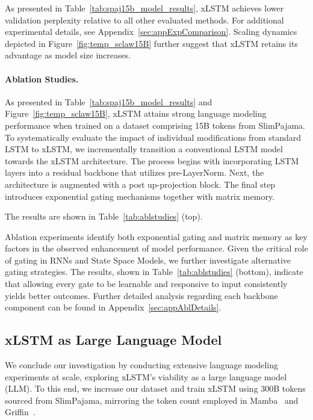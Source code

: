 As presented in Table~\ref{tab:spaj15b_model_results}, xLSTM achieves lower validation perplexity relative to all other evaluated methods. For additional experimental details, see Appendix~\ref{sec:appExpComparison}. Scaling dynamics depicted in Figure~\ref{fig:temp_sclaw15B} further suggest that xLSTM retains its advantage as model size increases.

\paragraph{Ablation Studies.}
As presented in Table~\ref{tab:spaj15b_model_results} and Figure~\ref{fig:temp_sclaw15B}, xLSTM attains strong language modeling performance when trained on a dataset comprising 15B tokens from SlimPajama. To systematically evaluate the impact of individual modifications from standard LSTM to xLSTM, we incrementally transition a conventional LSTM model towards the xLSTM architecture. The process begins with incorporating LSTM layers into a residual backbone that utilizes pre-LayerNorm. Next, the architecture is augmented with a post up-projection block. The final step introduces exponential gating mechanisms together with matrix memory.

The results are shown in Table~\ref{tab:ablstudies} (top). 

Ablation experiments identify both exponential gating and matrix memory as key factors in the observed enhancement of model performance. Given the critical role of gating in RNNs and State Space Models, we further investigate alternative gating strategies. The results, shown in Table~\ref{tab:ablstudies} (bottom), indicate that allowing every gate to be learnable and responsive to input consistently yields better outcomes. Further detailed analysis regarding each backbone component can be found in Appendix~\ref{sec:appAblDetails}.

\subsection{xLSTM as Large Language Model}
\label{sec:ExpLanguage}

We conclude our investigation by conducting extensive language modeling experiments at scale, exploring xLSTM's viability as a large language model (LLM). To this end, we increase our dataset and train xLSTM using 300B tokens sourced from SlimPajama, mirroring the token count employed in Mamba~\citep{Gu:24arxiv} and Griffin~\citep{De:24arxiv}.


